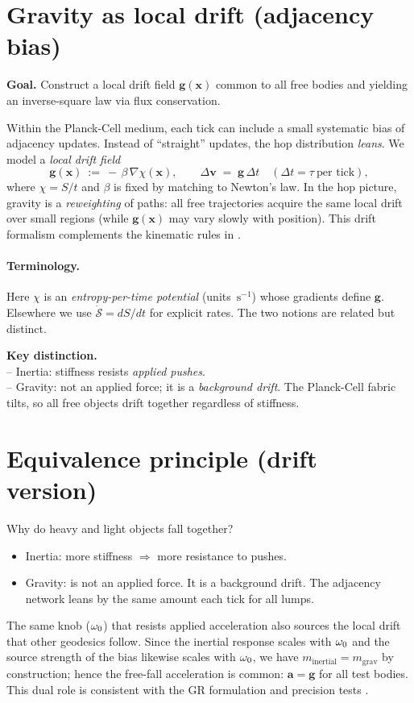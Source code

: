 \documentclass[11pt,oneside]{article}
\begin{document}
\section{Gravity as local drift (adjacency bias)}
\textbf{Goal.} Construct a local drift field $\mathbf g(\mathbf x)$ common to all free bodies and yielding an inverse-square law via flux conservation.

Within the Planck-Cell medium, each tick can include a small systematic bias of adjacency updates. Instead of ``straight'' updates, the hop distribution \emph{leans}. We model a \emph{local drift field}
\[
\mathbf g(\mathbf x)\ :=\ -\,\beta\,\nabla\chi(\mathbf x),\qquad
\Delta\mathbf v \;=\; \mathbf g\,\Delta t\quad(\Delta t=\tau\ \text{per tick}),
\]
where $\chi=S/t$ and $\beta$ is fixed by matching to Newton’s law. In the hop picture, gravity is a \emph{reweighting} of paths: all free trajectories acquire the same local drift over small regions (while $\mathbf g(\mathbf x)$ may vary slowly with position). This drift formalism complements the kinematic rules in \cite{langstaff2025_planck_cell_kinematics}.

\paragraph{Terminology.}
Here $\chi$ is an \emph{entropy-per-time potential} (units $\,\mathrm{s^{-1}}$) whose gradients define $\mathbf g$. Elsewhere we use $\dot{\mathcal S}=dS/dt$ for explicit rates. The two notions are related but distinct.

\begin{tcolorbox}
\textbf{Key distinction.}\\
-- Inertia: stiffness resists \emph{applied pushes}.\\
-- Gravity: not an applied force; it is a \emph{background drift}. The Planck-Cell fabric tilts, so all free objects drift together regardless of stiffness.
\end{tcolorbox}

\section{Equivalence principle (drift version)}
Why do heavy and light objects fall together?
\begin{itemize}
  \item Inertia: more stiffness $\Rightarrow$ more resistance to pushes.
  \item Gravity: is not an applied force. It is a background drift. The adjacency network leans by the same amount each tick for all lumps.
\end{itemize}
The same knob ($\omega_0$) that resists applied acceleration also sources the local drift that other geodesics follow. Since the inertial response scales with $\omega_0$ and the source strength of the bias likewise scales with $\omega_0$, we have $m_{\text{inertial}}=m_{\text{grav}}$ by construction; hence the free-fall acceleration is common: $\mathbf a=\mathbf g$ for all test bodies. This dual role is consistent with the GR formulation and precision tests \cite{einstein1916foundation,will2014confrontation}.
\end{document}
